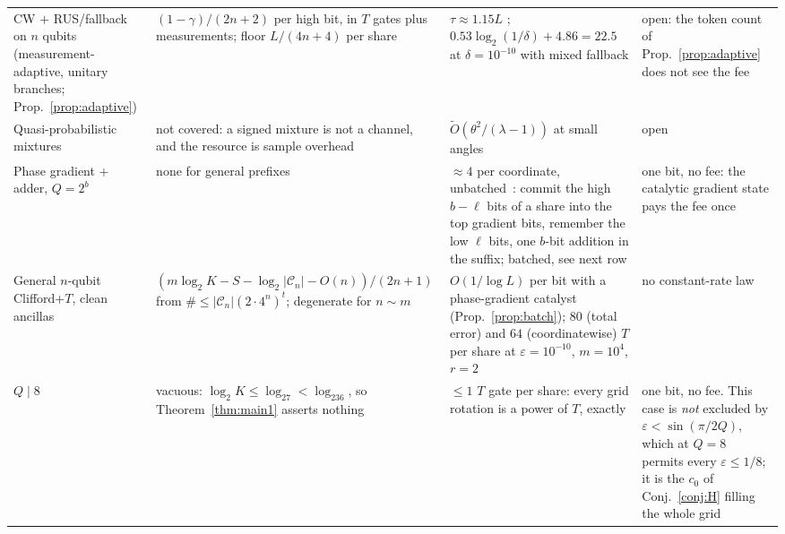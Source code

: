 \documentclass[aps,prx,twocolumn,superscriptaddress,nofootinbib,longbibliography]{revtex4-2}
\theoremstyle{plain}
\theoremstyle{definition}
\theoremstyle{remark}
\begin{document}
\begin{table}[t]
\begin{tabular}{@{}p{3.6cm} p{5.2cm} p{4.6cm} p{3.4cm}@{}}
\raggedright CW $+$ RUS/fallback on $n$ qubits (measurement-adaptive, unitary branches; Prop.~\ref{prop:adaptive}) & \raggedright $(1-\gamma)/(2n+2)$ per high bit, in $T$ gates plus measurements; floor $L/(4n+4)$ per share & \raggedright $\tau\approx1.15L$ \cite{BRS}; $0.53\log_2(1/\delta)+4.86=22.5$ at $\delta=10^{-10}$ with mixed fallback \cite{KLMPP,Bothe} & \raggedright open: the token count of Prop.~\ref{prop:adaptive} does not see the fee\tabularnewline
\raggedright Quasi-probabilistic mixtures \cite{Bothe} & \raggedright not covered: a signed mixture is not a channel, and the resource is sample overhead & \raggedright $\tilde O(\theta^2/(\lambda-1))$ at small angles \cite{Bothe} & \raggedright open\tabularnewline
\raggedright Phase gradient + adder, $Q=2^b$ & \raggedright none for general prefixes & \raggedright $\approx4$ per coordinate, unbatched~\cite{Gidney}: commit the high $b-\ell$ bits of a share into the top gradient bits, remember the low $\ell$ bits, one $b$-bit addition in the suffix; batched, see next row & \raggedright one bit, no fee: the catalytic gradient state pays the fee once\tabularnewline
\raggedright General $n$-qubit Clifford+$T$, clean ancillas & \raggedright $(m\log_2K-S-\log_2|\mathcal C_n|-O(n))/(2n+1)$ from $\#\le|\mathcal C_n|(2\cdot4^n)^t$; degenerate for $n\sim m$ & \raggedright $O(1/\log L)$ per bit with a phase-gradient catalyst (Prop.~\ref{prop:batch}); $80$ (total error) and $64$ (coordinatewise) $T$ per share at $\varepsilon=10^{-10}$, $m=10^4$, $r=2$ & \raggedright no constant-rate law\tabularnewline
\raggedright $Q\mid8$ & \raggedright vacuous: $\log_2K\le\log_27<\log_236$, so Theorem~\ref{thm:main1} asserts nothing & \raggedright $\le1$ $T$ gate per share: every grid rotation is a power of $T$, exactly & \raggedright one bit, no fee. This case is \emph{not} excluded by $\varepsilon<\sin(\pi/2Q)$, which at $Q=8$ permits every $\varepsilon\le1/8$; it is the $c_0$ of Conj.~\ref{conj:H} filling the whole grid\tabularnewline
\bottomrule
\end{tabular}
\end{table}
\end{document}

